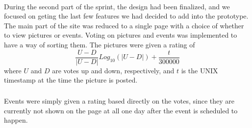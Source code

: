 \paragraph{} During the second part of the sprint, the design had been finalized, and we focused on geting the last few features we had decided to add into the prototype. The main part of the site was reduced to a single page with a choice of whether to view pictures or events. Voting on pictures and events was implemented to have a way of sorting them. The pictures were given a rating of 
\begin{equation} \label{eq:S5DesignImplSorting}
\frac{U-D}{|U-D|} Log_{10}(|U-D|) + \frac{t}{300000}
\end{equation}
where $U$ and $D$ are votes up and down, respectively, and $t$ is the UNIX timestamp at the time the picture is posted.
\subparagraph{} Events were simply given a rating based directly on the votes, since they are currently not shown on the page at all one day after the event is scheduled to happen.

